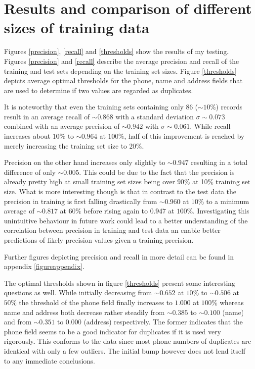 \documentclass[conference]{IEEEtran}
\newcommand{\unsim}{\mathord{\sim}}
\begin{document}
\section{Results and comparison of different sizes of training data}\label{comparison}
Figures \ref{precision}, \ref{recall} and \ref{thresholds} show the results of my testing. Figures \ref{precision} and \ref{recall} describe the average precision and recall of the training and test sets depending on the training set sizes. Figure \ref{thresholds} depicts average optimal thresholds for the phone, name and address fields that are used to determine if two values are regarded as duplicates.



It is noteworthy that even the training sets containing only $86$ ($\unsim10\%$) records result in an average recall of $\unsim0.868$ with a standard deviation $\sigma\sim0.073$ combined with an average precision of $\unsim0.942$ with $\sigma\sim0.061$. While recall increases about $10\%$ to $\unsim0.964$ at $100\%$, half of this improvement is reached by merely increasing the training set size to $20\%$.

Precision on the other hand increases only slightly to $\unsim0.947$ resulting in a total difference of only  $\unsim0.005$. This could be due to the fact that the precision is already pretty high at small training set sizes being over $90\%$ at 10\% training set size. What is more interesting though is that in contrast to the test data the precision in training is first falling drastically from $\unsim0.960$ at $10\%$ to a minimum average of $\unsim0.817$ at $60\%$ before rising again to $0.947$ at $100\%$. Investigating this unintuitive behaviour in future work could lead to a better understanding of the correlation between precision in training and test data an enable better predictions of likely precision values given a training precision.

Further figures depicting precision and recall in more detail can be found in appendix \ref{figureappendix}.



The optimal thresholds shown in figure \ref{thresholds} present some interesting questions as well. While initially decreasing from $\unsim0.652$ at $10\%$ to $\unsim0.506$ at $50\%$ the threshold of the phone field finally increases to $1.000$ at $100\%$ whereas name and address both decrease rather steadily from $\unsim0.385$ to $\unsim0.100$ (name) and from  $\unsim0.351$ to $0.000$ (address) respectively. The former indicates that the phone field seems to be a good indicator for duplicates if it is used very rigorously. This conforms to the data since most phone numbers of duplicates are identical with only a few outliers. The initial bump however does not lend itself to any immediate conclusions.
\end{document}
